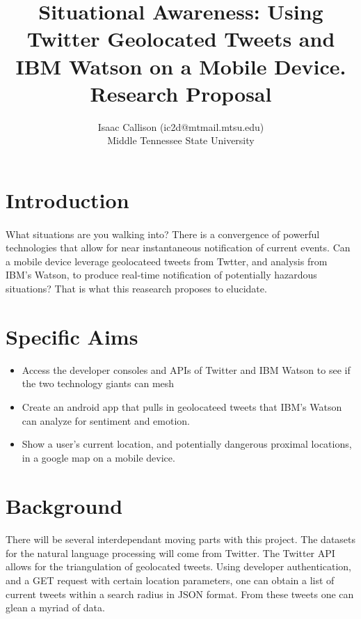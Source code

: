 \documentclass[12pt, oneside]{article}
\title{Situational Awareness: Using Twitter Geolocated Tweets and IBM Watson on a Mobile Device.
\\\medskip Research Proposal}
\author{Isaac Callison (ic2d@mtmail.mtsu.edu)\\Middle Tennessee State University}
\begin{document}
\maketitle
\nocite{*}

\section{Introduction}
\paragraph{}
What situations are you walking into? There is a convergence of powerful
technologies that allow for near instantaneous notification of current events.
Can a mobile device leverage geolocateed tweets from Twtter, and analysis from
IBM's Watson, to produce real-time notification of potentially hazardous
situations? That is what this reasearch proposes to elucidate.

\section{Specific Aims}
\begin{itemize}
 \item Access the developer consoles and APIs of Twitter and IBM Watson to see
 if the two technology giants can mesh

 \item Create an android app that pulls in geolocateed tweets that IBM's Watson
 can analyze for sentiment and emotion.

 \item Show a user's current location, and potentially dangerous proximal
 locations, in a google map on a mobile device.

\end{itemize}

\section{Background}
\paragraph{}
There will be several interdependant moving parts with this project. The datasets for the natural language processing will come from Twitter. The
Twitter API allows for the triangulation of geolocated tweets\cite{TwitterGeo}.
Using developer authentication, and a GET request with certain location parameters, one can obtain a list of current tweets within a search radius in JSON format. From these tweets one can glean a myriad of data.
\end{document}
